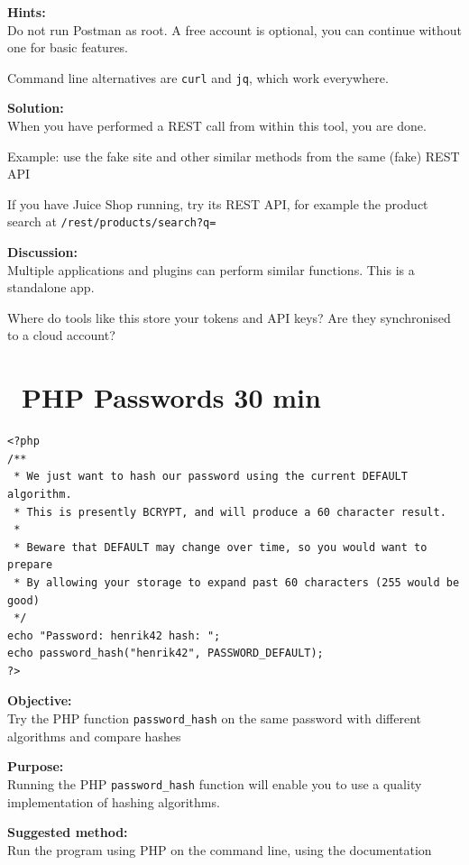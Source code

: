 \documentclass[a4paper,11pt,notitlepage]{report}
\begin{document}
{\bf Hints:}\\
Do not run Postman as root. A free account is optional, you can continue without one for basic features.

Command line alternatives are \verb+curl+ and \verb+jq+, which work everywhere.

{\bf Solution:}\\
When you have performed a REST call from within this tool, you are done.

Example: use the fake site  and other similar methods from the same (fake) REST API

If you have Juice Shop running, try its REST API, for example the product search at \verb+/rest/products/search?q=+

{\bf Discussion:}\\
Multiple applications and plugins can perform similar functions. This is a standalone app.

Where do tools like this store your tokens and API keys? Are they synchronised to a cloud account?


\chapter{\faInfoCircle\ PHP Passwords 30 min}
\label{ex:php-passwords}

\begin{verbatim}
<?php
/**
 * We just want to hash our password using the current DEFAULT algorithm.
 * This is presently BCRYPT, and will produce a 60 character result.
 *
 * Beware that DEFAULT may change over time, so you would want to prepare
 * By allowing your storage to expand past 60 characters (255 would be good)
 */
echo "Password: henrik42 hash: ";
echo password_hash("henrik42", PASSWORD_DEFAULT);
?>
\end{verbatim}

{\bf Objective:}\\
Try the PHP function \verb+password_hash+ on the same password with different algorithms and compare hashes

{\bf Purpose:}\\
Running the PHP \verb+password_hash+ function will enable you to use a quality implementation of hashing algorithms.

{\bf Suggested method:}\\
Run the program using PHP on the command line, using the documentation\\
\end{document}
